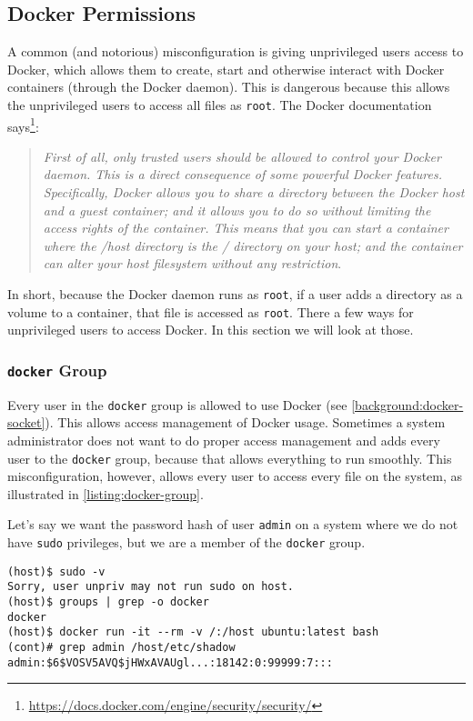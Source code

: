 \subsection{Docker Permissions}\label{subsection:docker-permissions}
A common (and notorious) misconfiguration is giving unprivileged users access to Docker, which allows them to create, start and otherwise interact with Docker containers (through the Docker daemon). This is dangerous because this allows the unprivileged users to access all files as \lstinline{root}. The Docker documentation says\footnote{\url{https://docs.docker.com/engine/security/security/}}:
\begin{quote}
\emph{First of all, only trusted users should be allowed to control your Docker daemon. This is a direct consequence of some powerful Docker features. Specifically, Docker allows you to share a directory between the Docker host and a guest container; and it allows you to do so without limiting the access rights of the container. This means that you can start a container where the /host directory is the / directory on your host; and the container can alter your host filesystem without any restriction}.
\end{quote}

In short, because the Docker daemon runs as \lstinline{root}, if a user adds a directory as a volume to a container, that file is accessed as \lstinline{root}. There a few ways for unprivileged users to access Docker. In this section we will look at those.

\subsubsection{\texorpdfstring{\lstinline{docker}}{docker} Group}
Every user in the \lstinline{docker} group is allowed to use Docker (see \autoref{background:docker-socket}). This allows access management of Docker usage. Sometimes a system administrator does not want to do proper access management and adds every user to the \lstinline{docker} group, because that allows everything to run smoothly. This misconfiguration, however, allows every user to access every file on the system, as illustrated in \autoref{listing:docker-group}.

\medskip

Let's say we want the password hash of user \lstinline{admin} on a system where we do not have \lstinline{sudo} privileges, but we are a member of the \lstinline{docker} group.

\begin{lstlisting}[caption={Docker \lstinline{group} exploit example.},captionpos=b,label={listing:docker-group}]
(host)$ sudo -v
Sorry, user unpriv may not run sudo on host.
(host)$ groups | grep -o docker
docker
(host)$ docker run -it --rm -v /:/host ubuntu:latest bash
(cont)# grep admin /host/etc/shadow
admin:$6$VOSV5AVQ$jHWxAVAUgl...:18142:0:99999:7:::
\end{lstlisting}

